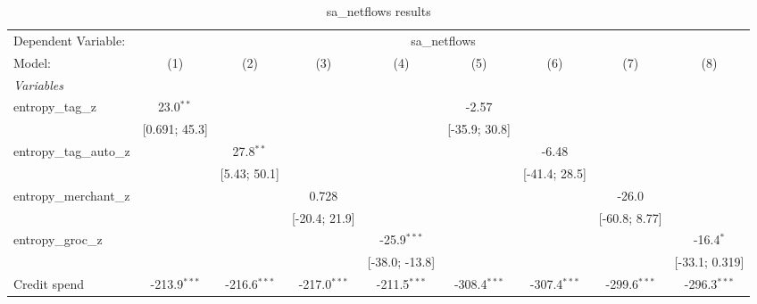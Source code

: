 
\begin{table}[htbp]
   \centering
   \tiny
   \begin{threeparttable}[b]
      \caption{\label{tab:reg_sa_netflows_full} sa\_netflows results}
      \begin{tabular}{lcccccccc}
         \tabularnewline \midrule \midrule
         Dependent Variable: & \multicolumn{8}{c}{sa\_netflows}\\
         Model:                   & (1)              & (2)              & (3)              & (4)              & (5)              & (6)              & (7)              & (8)\\  
         \midrule
         \emph{Variables}\\
         entropy\_tag\_z          & 23.0$^{**}$      &                  &                  &                  & -2.57            &                  &                  &   \\   
                                  & [0.691; 45.3]    &                  &                  &                  & [-35.9; 30.8]    &                  &                  &   \\   
         entropy\_tag\_auto\_z    &                  & 27.8$^{**}$      &                  &                  &                  & -6.48            &                  &   \\   
                                  &                  & [5.43; 50.1]     &                  &                  &                  & [-41.4; 28.5]    &                  &   \\   
         entropy\_merchant\_z     &                  &                  & 0.728            &                  &                  &                  & -26.0            &   \\   
                                  &                  &                  & [-20.4; 21.9]    &                  &                  &                  & [-60.8; 8.77]    &   \\   
         entropy\_groc\_z         &                  &                  &                  & -25.9$^{***}$    &                  &                  &                  & -16.4$^{*}$\\   
                                  &                  &                  &                  & [-38.0; -13.8]   &                  &                  &                  & [-33.1; 0.319]\\   
         Credit spend             & -213.9$^{***}$   & -216.6$^{***}$   & -217.0$^{***}$   & -211.5$^{***}$   & -308.4$^{***}$   & -307.4$^{***}$   & -299.6$^{***}$   & -296.3$^{***}$\\   

\end{tabular}
\end{threeparttable}
\end{table}
